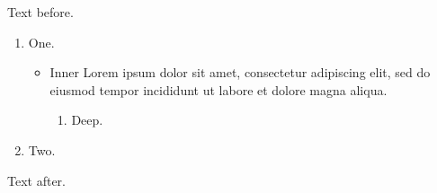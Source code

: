 \documentclass[10pt]{article}
\begin{document}
Text before.
\begin{enumerate}
\item One.
\begin{itemize}
\item Inner Lorem ipsum dolor sit amet, consectetur adipiscing elit, sed do eiusmod tempor incididunt ut labore et dolore magna aliqua.
\begin{enumerate}
\item Deep.
\end{enumerate}
\end{itemize}
\item Two.
\end{enumerate}
Text after.
\end{document}
